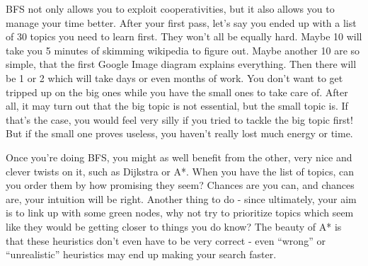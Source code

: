 BFS not only allows you to exploit cooperativities, but it also allows you to
manage your time better. After your first pass, let's say you ended up with a
list of 30 topics you need to learn first. They won't all be equally hard.
Maybe 10 will take you 5 minutes of skimming wikipedia to figure out. Maybe
another 10 are so simple, that the first Google Image diagram explains
everything. Then there will be 1 or 2 which will take days or even months of
work. You don't want to get tripped up on the big ones while you have the
small ones to take care of. After all, it may turn out that the big topic is
not essential, but the small topic is. If that's the case, you would feel very
silly if you tried to tackle the big topic first! But if the small one proves
useless, you haven't really lost much energy or time.

Once you're doing BFS, you might as well benefit from the other, very nice and
clever twists on it, such as Dijkstra or A*. When you have the list of topics,
can you order them by how promising they seem? Chances are you can, and
chances are, your intuition will be right. Another thing to do - since
ultimately, your aim is to link up with some green nodes, why not try to
prioritize topics which seem like they would be getting closer to things you
do know? The beauty of A* is that these heuristics don't even have to be very
correct - even ``wrong'' or ``unrealistic'' heuristics may end up making your
search faster.
